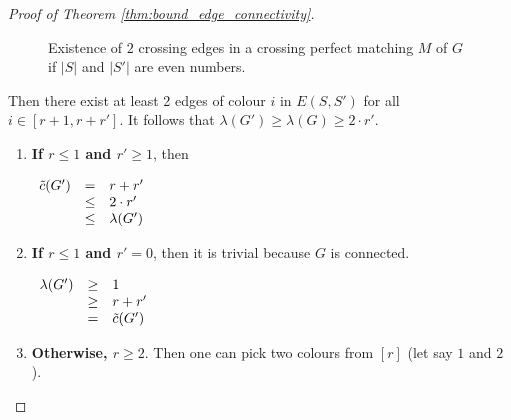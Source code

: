 \begin{proof}[Proof of Theorem \ref{thm:bound_edge_connectivity}]
\begin{enumerate}
            \begin{figure}[H]
                \caption{Existence of $2$ crossing edges in a crossing perfect matching $M$ of $G$ if $|S|$ and $|S'|$ are even numbers.}
                \label{fig:proof_lambda_even}
            \end{figure}
            
            Then there exist at least 2 edges of colour $i$ in $E(S, S')$ for all $i \in [r + 1, r + r']$.
            It follows that $\lambda(G') \geq \lambda(G) \geq 2 \cdot r'$.
            
            \begin{enumerate}
                \item 
                    \textbf{If $r \leq 1$ and $r' \geq 1$}, then 
                    
                    \begin{center}
                        $\begin{array}{l c l}
                            \Tilde{c}(G')  & =    & r + r' \\
                                            & \leq & 2 \cdot r' \\
                                            & \leq & \lambda(G')
                        \end{array}$
                    \end{center}
                    
                \item 
                    \textbf{If $r \leq 1$ and $r' = 0$}, then it is trivial because $G$ is connected.
                    
                    \begin{center}
                        $\begin{array}{lcl}
                            \lambda(G')  & \geq & 1 \\
                                          & \geq & r + r' \\
                                          & =    & \Tilde{c}(G')
                        \end{array}$
                    \end{center}
                    
                \item
                    \textbf{Otherwise, $r \geq 2$}.
                    Then one can pick two colours from $[r]$ (let say $1$ and $2$).
                    

\end{enumerate}
\end{enumerate}
\end{proof}
